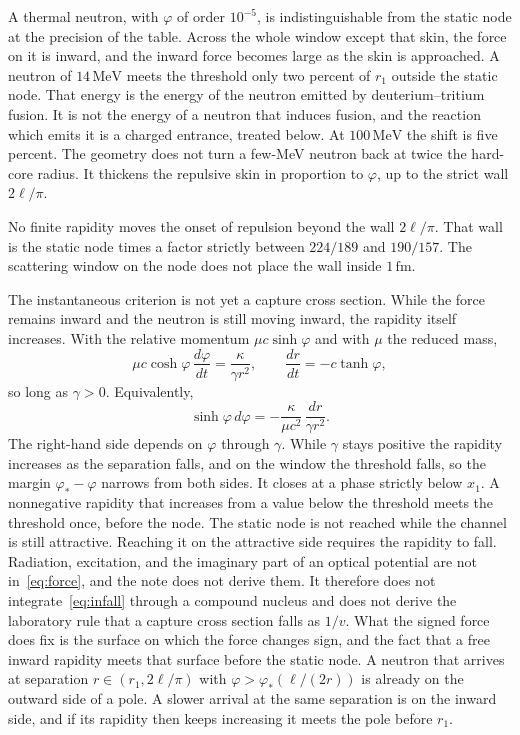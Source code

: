 \documentclass[a4paper]{article}
\begin{document}
A thermal neutron, with \(\varphi\) of order \(10^{-5}\), is indistinguishable from the static node at the precision of the table. Across the whole window except that skin, the force on it is inward, and the inward force becomes large as the skin is approached. A neutron of \(14\,\mathrm{MeV}\) meets the threshold only two percent of \(r_1\) outside the static node. That energy is the energy of the neutron emitted by deuterium--tritium fusion. It is not the energy of a neutron that induces fusion, and the reaction which emits it is a charged entrance, treated below. At \(100\,\mathrm{MeV}\) the shift is five percent. The geometry does not turn a few-MeV neutron back at twice the hard-core radius. It thickens the repulsive skin in proportion to \(\varphi\), up to the strict wall \(2\ell/\pi\).

No finite rapidity moves the onset of repulsion beyond the wall \(2\ell/\pi\). That wall is the static node times a factor strictly between \(224/189\) and \(190/157\). The scattering window on the node does not place the wall inside \(1\,\mathrm{fm}\).

The instantaneous criterion is not yet a capture cross section. While the force remains inward and the neutron is still moving inward, the rapidity itself increases. With the relative momentum \(\mu c\sinh\varphi\) and with \(\mu\) the reduced mass,
\begin{equation}
\label{eq:infall}
\mu c\cosh\varphi\,\frac{d\varphi}{dt}
  =\frac{\kappa}{\gamma r^{2}},
\qquad
\frac{dr}{dt}=-c\tanh\varphi,
\end{equation}
so long as \(\gamma>0\). Equivalently,
\[
\sinh\varphi\,d\varphi
  =-\frac{\kappa}{\mu c^{2}}\,\frac{dr}{\gamma r^{2}}.
\]
The right-hand side depends on \(\varphi\) through \(\gamma\). While \(\gamma\) stays positive the rapidity increases as the separation falls, and on the window the threshold falls, so the margin \(\varphi_*-\varphi\) narrows from both sides. It closes at a phase strictly below \(x_1\). A nonnegative rapidity that increases from a value below the threshold meets the threshold once, before the node. The static node is not reached while the channel is still attractive. Reaching it on the attractive side requires the rapidity to fall. Radiation, excitation, and the imaginary part of an optical potential are not in~\eqref{eq:force}, and the note does not derive them. It therefore does not integrate~\eqref{eq:infall} through a compound nucleus and does not derive the laboratory rule that a capture cross section falls as \(1/v\). What the signed force does fix is the surface on which the force changes sign, and the fact that a free inward rapidity meets that surface before the static node. A neutron that arrives at separation \(r\in(r_1,2\ell/\pi)\) with \(\varphi>\varphi_*(\ell/(2r))\) is already on the outward side of a pole. A slower arrival at the same separation is on the inward side, and if its rapidity then keeps increasing it meets the pole before \(r_1\).
\end{document}
